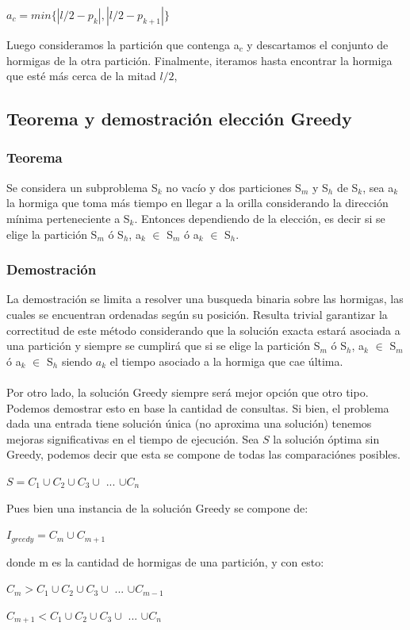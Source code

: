 \documentclass[11pt,spanish]{article}
\begin{document}
\begin{center} $a_{c} = min\{|l/2-p_k|,|l/2-p_{k+1}|\}$\end{center}
Luego consideramos la partición que contenga a$_{c}$ y descartamos el conjunto de hormigas de la otra partición. Finalmente, iteramos hasta encontrar la hormiga que esté más cerca de la mitad $l/2$,

\newpage
\subsection{Teorema y demostración elección Greedy}
\subsubsection{Teorema}
Se considera un subproblema S$_{k}$ no vacío y dos particiones S$_{m}$ y S$_{h}$ de S$_{k}$, sea a$_{k}$ la hormiga que toma más tiempo en llegar a la orilla considerando la dirección mínima perteneciente a S$_{k}$. Entonces dependiendo de la elección, es decir si se elige la partición S$_{m}$ ó S$_{h}$, a$_{k}$ $\in$ S$_{m}$ ó a$_{k}$ $\in$ S$_{h}$.
\subsubsection{Demostración}
La demostración se limita a resolver una busqueda binaria sobre las hormigas, las cuales se encuentran ordenadas según su posición. Resulta trivial garantizar la correctitud de este método considerando que la solución exacta estará asociada a una partición y siempre se cumplirá que si se elige la partición S$_{m}$ ó S$_{h}$, a$_{k}$ $\in$ S$_{m}$ ó a$_{k}$ $\in$ S$_{h}$ siendo $a_k$ el tiempo asociado a la hormiga que cae última.\\\\Por otro lado, la solución Greedy siempre será mejor opción que otro tipo. Podemos demostrar esto en base  la cantidad de consultas. Si bien, el problema dada una entrada tiene solución única (no aproxima una solución) tenemos mejoras significativas en el tiempo de ejecución.
Sea $S$ la solución óptima sin Greedy, podemos decir que esta se compone de todas las comparaciónes posibles.
\begin{center}$S = C_1 \cup C_2 \cup C_3 \cup$ ... $\cup C_n$\end{center}
Pues bien una instancia de la solución Greedy se compone de: 
\begin{center}$I_{greedy} = C_m \cup C_{m+1} $\end{center}
donde m es la cantidad de hormigas de una partición, y con esto:
\begin{center}$C_m > C_1 \cup C_2 \cup C_3 \cup$ ... $\cup C_{m-1}$\end{center}
\begin{center}$C_{m+1} < C_1 \cup C_2 \cup C_3 \cup$ ... $\cup C_n$\end{center}
\end{document}
